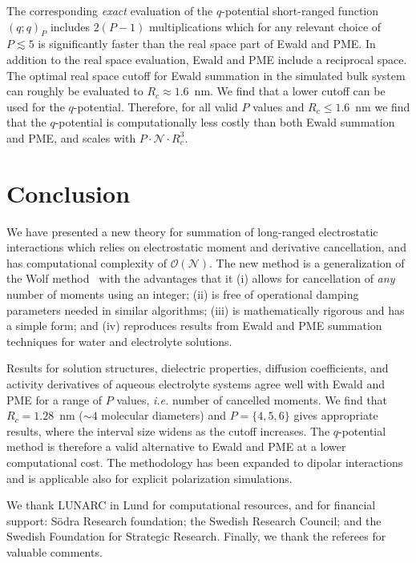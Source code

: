 \documentclass[
journal=jctcce,
manuscript=letter]{achemso}
\begin{document}
The corresponding \emph{exact} evaluation of the $q$-potential short-ranged function $(q;q)_P$ includes $2(P-1)$ multiplications which for any relevant choice of $P \lesssim  5$ is significantly faster than the real space part of Ewald and PME.
In addition to the real space evaluation, Ewald and PME include a reciprocal space. The optimal real space cutoff for Ewald summation in the simulated bulk system can roughly be evaluated\cite{kolafa1992cutoff} to $R_c\approx 1.6$~nm.
We find that a lower cutoff can be used for the $q$-potential.
Therefore, for all valid $P$ values and $R_c\le 1.6$~nm we find that the $q$-potential is computationally less costly than both Ewald summation and PME, and scales with $P\cdot \mathcal{N}\cdot R_c^3$.

\section{Conclusion}\label{sec:conclusion}

We have presented a new theory for summation of long-ranged electrostatic interactions which relies on electrostatic moment and derivative cancellation, and has computational complexity of $\mathcal{O}(\mathcal{N})$.
The new method is a generalization of the Wolf method~\cite{wolf1999exact} with the advantages that it
(i) allows for cancellation of \emph{any} number of moments using an integer;
(ii) is free of operational damping parameters needed in similar algorithms;
(iii) is mathematically rigorous and has a simple form; and
(iv) reproduces results from Ewald and PME summation techniques for water and electrolyte solutions.

Results for solution structures, dielectric properties, diffusion coefficients, and activity derivatives of aqueous electrolyte systems agree well with Ewald and PME for a range of $P$ values, \emph{i.e.} number of cancelled moments.
We find that $R_c=1.28$~nm ($\sim 4$ molecular diameters) and $P=\{4,5,6\}$ gives appropriate results, where the interval size widens as the cutoff increases. The $q$-potential method is therefore a valid alternative to Ewald and PME at a lower computational cost.
The methodology has been expanded to dipolar interactions and is applicable also for explicit polarization simulations.

\acknowledgement
We thank LUNARC in Lund for computational resources, and for financial support:
S\"{o}dra Research foundation;
the Swedish Research Council;
and the Swedish Foundation for Strategic Research.
Finally, we thank the referees for valuable comments.
\end{document}
